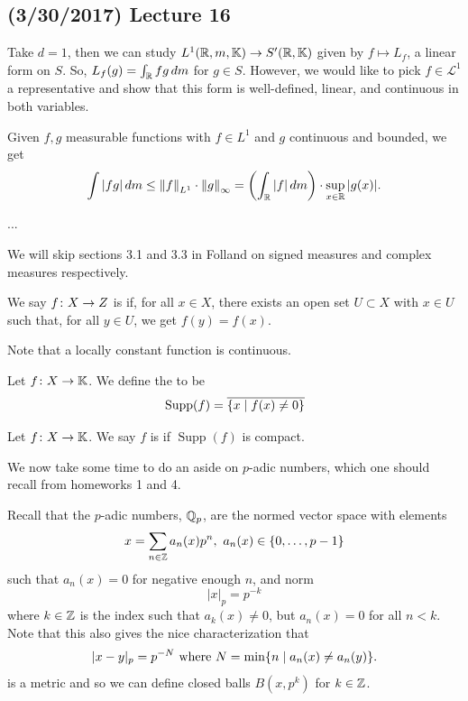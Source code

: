 \documentclass[11pt,leqno,oneside]{amsbook}
\numberwithin{thm}{section}
\newcommand{\cL}{\mathcal{L}}
\newcommand{\K}{\mathbb{K}} %
\newcommand{\supp}{\operatorname{Supp}}
\begin{document}
\subsection*{(3/30/2017) Lecture 16}
Take \(d=1\), then we can study \(L^1(\R,m,\K) \to S'(\R,\K)\) given
by \(f \mapsto L_f\), a linear form on \(S\). So, \(L_f(g) = \int_\R
fg \d m\) for \(g \in S\). However, we would like to pick \(f \in
\cL^1\) a representative and show that this form is well-defined, linear,
and continuous in both variables.
\begin{prop}\label{L1-Linf-bound-1}
  Given \(f,g\) measurable functions with \(f \in L^1\) and \(g\)
  continuous and bounded, we get \[
    \int |fg| \d m \leq \norm[f]_{L^1} \cdot \norm[g]_\infty =
    \left(\int_\R |f| \d m\right) \cdot \sup_{x \in \R} |g(x)|.
  \]
\end{prop}
...
\begin{rmk}
  We will skip sections 3.1 and 3.3 in Folland on signed measures and
  complex measures respectively.
\end{rmk}
\begin{defn}
  We say \(f \from X \to Z\) is  if, for all \(x \in
  X\), there exists an open set \(U \subset X\) with \(x \in U\) such
  that, for all \(y \in U\), we get \(f(y) = f(x)\).
\end{defn}
Note that a locally constant function is continuous.
\begin{defn}
  Let \(f \from X \to \K\). We define the  to
  be \[
    \supp(f) = \ov{\{x \st f(x) \neq 0\}}
  \]
\end{defn}
\begin{defn}
  Let \(f \from X \to \K\). We say \(f\) is 
  if \(\supp(f)\) is compact.
\end{defn}
We now take some time to do an aside on \(p\)-adic numbers, which one
should recall from homeworks 1 and 4.
\begin{defn}
  Recall that the \(p\)-adic numbers, \(\Q_p\), are the normed vector
  space with elements \[
    x = \sum_{n \in \Z} a_n(x) p^n, \ a_n(x) \in \{0, \ldots, p-1\}
  \]
  such that \(a_n(x) = 0\) for negative enough \(n\), and norm \[
    |x|_p = p^{-k}
  \]
  where \(k \in \Z\) is the index such that \(a_k(x) \neq 0\), but
  \(a_n(x) = 0\) for all \(n < k\). Note that this also gives the nice
  characterization that \[
    |x-y|_p = p^{-N} \text{ where } N = \min\{n \st a_n(x) \neq a_n(y)\}.
  \]
  is a metric and so we can define closed balls \(B(x,p^k)\) for \(k
  \in \Z\).
\end{defn}
\end{document}
